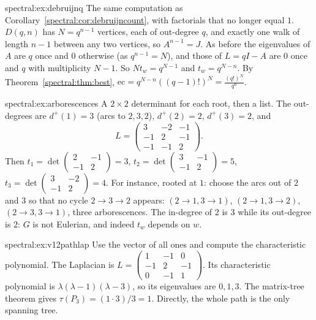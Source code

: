\begin{solution}{spectral:ex:debruijnq}
\idea The same computation as Corollary~\ref{spectral:cor:debruijncount}, with factorials that no longer equal $1$.
\writeup $D(q,n)$ has $N=q^{n-1}$ vertices, each of out-degree $q$, and exactly one walk of length $n-1$ between any two vertices, so $A^{n-1}=J$. As before the eigenvalues of $A$ are $q$ once and $0$ otherwise
(as $q^{n-1}=N$), and those of $L=qI-A$ are $0$ once and $q$ with multiplicity $N-1$. So $Nt_w=q^{N-1}$ and $t_w=q^{N-n}$. By Theorem~\ref{spectral:thm:best}, $\mathrm{ec}=q^{N-n}((q-1)!)^N=\frac{(q!)^N}{q^n}$.
\end{solution}

\begin{solution}{spectral:ex:arborescences}
\idea A $2\times2$ determinant for each root, then a list.
\writeup The out-degrees are $d^+(1)=3$ (arcs to $2,3,2$), $d^+(2)=2$, $d^+(3)=2$, and
\[
L=\begin{pmatrix}3&-2&-1\\-1&2&-1\\-1&-1&2\end{pmatrix}.
\]
Then $t_1=\det\begin{pmatrix}2&-1\\-1&2\end{pmatrix}=3$, $t_2=\det\begin{pmatrix}3&-1\\-1&2\end{pmatrix}=5$, $t_3=\det\begin{pmatrix}3&-2\\-1&2\end{pmatrix}=4$. For instance, rooted at $1$: choose the arcs out of $2$ and $3$ so that no cycle $2\to3\to2$
appears: $(2\to1,3\to1)$, $(2\to1,3\to2)$, $(2\to3,3\to1)$, three arborescences. The in-degree of $2$ is $3$ while its out-degree is $2$: $G$ is not Eulerian, and indeed $t_w$ depends on $w$.
\end{solution}







\begin{solution}{spectral:ex:v12pathlap}
\idea Use the vector of all ones and compute the characteristic polynomial.
\writeup The Laplacian is $L=\begin{pmatrix}1&-1&0\\-1&2&-1\\0&-1&1\end{pmatrix}$. Its characteristic polynomial is $\lambda(\lambda-1)(\lambda-3)$, so its eigenvalues are $0,1,3$. The matrix-tree theorem gives $\tau(P_3)=(1\cdot3)/3=1$. Directly, the whole path is the only spanning tree.
\end{solution}

